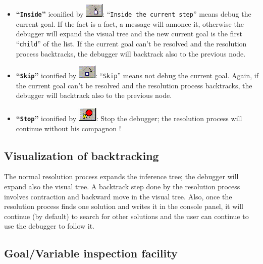 \documentclass{book}
\begin{document}
\begin{itemize}

\item {\bf ``\texttt{Inside}''} iconified by
\includegraphics{InStepBt.png}: ``\texttt{Inside the current step}''
means debug the current goal. If the fact is a fact, a message will
annonce it, otherwise the debugger will expand the visual tree and the
new current goal is the first ``\texttt{child}'' of the list. If the
current goal can't be resolved and the resolution process backtracks,
the debugger will backtrack also to the previous node.

\item {\bf ``\texttt{Skip}''} iconified by
\includegraphics{SkipStepBt.png}: ``\texttt{Skip}'' means not debug
the current goal. Again, if the current goal can't be resolved and the
resolution process backtracks, the debugger will backtrack also to the
previous node.

\item 

{\bf ``\texttt{Stop}''} iconified by \includegraphics{StopStepBt.png}:
Stop the debugger; the resolution process will continue without his
compagnon !

\end{itemize}

\subsection{Visualization of backtracking} 

The normal resolution process expands the inference tree; the
debugger will expand also the visual tree.  A backtrack step done by
the resolution process involves contraction and backward move in the
visual tree. Also, once the resolution process finds one solution and
writes it in the console panel, it will continue (by default) to
search for other solutions and the user can continue to use the
debugger to follow it.

\subsection{Goal/Variable inspection facility}
\end{document}
